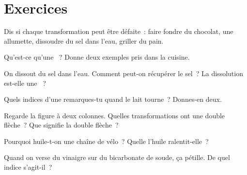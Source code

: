 \section{Exercices}

\begin{exercise}[$\star$]\label{exo:g5:irreversible-changes:1}
Dis si chaque transformation peut être défaite~: faire fondre du
chocolat,  une allumette, dissoudre du sel dans l'eau, griller du
pain.
\end{exercise}

\begin{exercise}[$\star$]\label{exo:g5:irreversible-changes:2}
Qu'est-ce qu'une ~? Donne deux exemples pris dans
la cuisine.
\end{exercise}

\begin{exercise}[$\star$]\label{exo:g5:irreversible-changes:3}
On dissout du sel dans l'eau. Comment peut-on récupérer le sel~? La
dissolution est-elle une ~?
\end{exercise}

\begin{exercise}[$\star$]\label{exo:g5:irreversible-changes:4}
Quels indices d'une  remarques-tu quand le lait
tourne~? Donnes-en deux.
\end{exercise}

\begin{exercise}[$\star$]\label{exo:g5:irreversible-changes:5}
Regarde la figure à deux colonnes. Quelles transformations ont une
double flèche~? Que signifie la double flèche~?
\end{exercise}

\begin{exercise}[$\star$]\label{exo:g5:irreversible-changes:6}
Pourquoi huile-t-on une chaîne de vélo~? Quelle 
l'huile ralentit-elle~?
\end{exercise}

\begin{exercise}[$\star$]\label{exo:g5:irreversible-changes:7}
Quand on verse du vinaigre sur du bicarbonate de soude, ça pétille. De
quel indice s'agit-il~?
\end{exercise}

